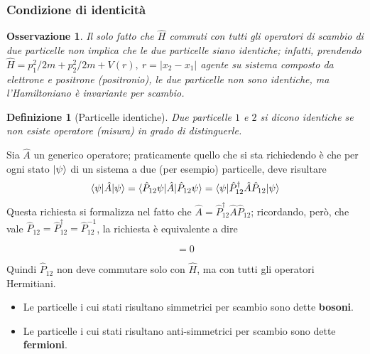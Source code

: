 \documentclass[11pt, a4paper]{scrartcl} %
\numberwithin{equation}{subsection}
\theoremstyle{style2}
\newtheorem{osservazione}{Osservazione}[section]
\theoremstyle{style1}
\newtheorem{definizione}{Definizione}[section]
\newenvironment{boxenv}[1][]{
    \begin{eqbox}[#1]
    }{
   \end{eqbox}
}
\begin{document}
\subsubsection{Condizione di identicit\`a}
\begin{osservazione}
Il solo fatto che $\hat{H}$ commuti con tutti gli operatori di scambio di due particelle non implica che le due particelle siano identiche; infatti, prendendo $\hat{H} = p_1^2 / 2m + p_2^2 / 2m + V(r), \ r = \lvert x_2 -x_1 \rvert $ agente su sistema composto da elettrone e positrone (positronio), le due particelle non sono identiche, ma l'Hamiltoniano \`e invariante per scambio.
\end{osservazione}
\begin{definizione}
	[Particelle identiche]
Due particelle $1$ e $2$ si dicono identiche se non esiste operatore (misura) in grado di distinguerle.
\end{definizione}
Sia $\hat{A}$ un generico operatore; praticamente quello che si sta richiedendo \`e che per ogni stato $\ket{\psi }  $ di un sistema a due (per esempio) particelle, deve risultare
\begin{equation}
	\braket{\psi |\hat{A}|\psi } = \braket{\hat{P}_{12} \psi |\hat{A}|\hat{P}_{12} \psi } = \braket{\psi |\hat{P}_{12} ^\dagger \hat{A}\hat{P}_{12} |\psi } 
\end{equation}
Questa richiesta si formalizza nel fatto che $\hat{A} = \hat{P}_{12} ^\dagger \hat{A}\hat{P}_{12} $; ricordando, per\`o, che vale $\hat{P}_{12} = \hat{P}_{12} ^\dagger = \hat{P}_{12} ^{-1} $, la richiesta \`e equivalente a dire
\begin{boxenv}[]
\begin{equation}
	[\hat{A}, \hat{P}_{12} ]=  0
\end{equation}
\end{boxenv}
\noindent Quindi $\hat{P}_{12} $ non deve commutare solo con $\hat{H}$, ma con tutti gli operatori Hermitiani.
\begin{boxenv}[]
\begin{itemize}
	\item Le particelle i cui stati risultano simmetrici per scambio sono dette \textbf{bosoni}.
	\item Le particelle i cui stati risultano anti-simmetrici per scambio sono dette \textbf{fermioni}.
\end{itemize}
\end{boxenv}
\end{document}
